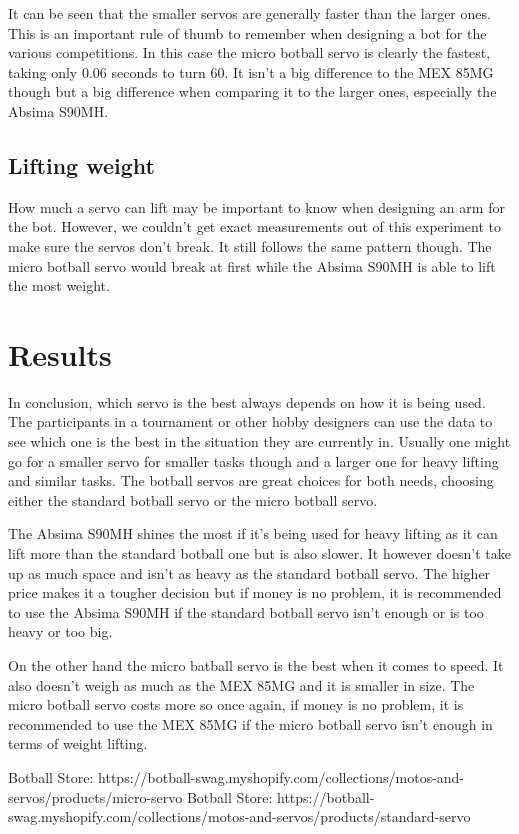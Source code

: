 \documentclass[conference]{IEEEtran}
\begin{document}
It can be seen that the smaller servos are generally faster than the larger ones. This is an important rule of thumb to remember when designing a bot for the various competitions. In this case the micro botball servo is clearly the fastest, taking only 0.06 seconds to turn 60. It isn't a big difference to the MEX 85MG though but a big difference when comparing it to the larger ones, especially the Absima S90MH.

\subsection{Lifting weight}
How much a servo can lift may be important to know when designing an arm for the bot. However, we couldn't get exact measurements out of this experiment to make sure the servos don't break. It still follows the same pattern though. The micro botball servo would break at first while the Absima S90MH is able to lift the most weight. 

\section{Results}

In conclusion, which servo is the best always depends on how it is being used. The participants in a tournament or other hobby designers can use the data to see which one is the best in the situation they are currently in. Usually one might go for a smaller servo for smaller tasks though and a larger one for heavy lifting and similar tasks. The botball servos are great choices for both needs, choosing either the standard botball servo or the micro botball servo. 

The Absima S90MH shines the most if it's being used for heavy lifting as it can lift more than the standard botball one but is also slower. It however doesn't take up as much space and isn't as heavy as the standard botball servo. The higher price makes it a tougher decision but if money is no problem, it is recommended to use the Absima S90MH if the standard botball servo isn't enough or is too heavy or too big.

On the other hand the micro batball servo is the best when it comes to speed. It also doesn't weigh as much as the MEX 85MG and it is smaller in size. The micro botball servo costs more so once again, if money is no problem, it is recommended to use the MEX 85MG if the micro botball servo isn't enough in terms of weight lifting. 

\begin{thebibliography}{00}
 Botball Store: https://botball-swag.myshopify.com/collections/motos-and-servos/products/micro-servo
 Botball Store: https://botball-swag.myshopify.com/collections/motos-and-servos/products/standard-servo
\end{thebibliography}
\end{document}

